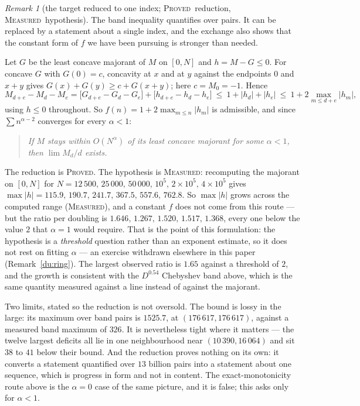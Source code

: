 \documentclass[11pt]{article}
\theoremstyle{definition}
\theoremstyle{remark}
\newtheorem{remark}[theorem]{Remark}
\newcommand{\PROVED}{\textsc{Proved}}
\newcommand{\MEASURED}{\textsc{Measured}}
\begin{document}
\begin{remark}[the target reduced to one index; \PROVED\ reduction, \MEASURED\ hypothesis]\label{fr:concave}
The band inequality quantifies over pairs. It can be replaced by a statement about a single index, and
the exchange also shows that the constant form of $f$ we have been pursuing is stronger than needed.

Let $G$ be the least concave majorant of $M$ on $[0,N]$ and $h=M-G\le0$. For concave $G$ with $G(0)=c$,
concavity at $x$ and at $y$ against the endpoints $0$ and $x+y$ gives $G(x)+G(y)\ge c+G(x+y)$; here
$c=M_0=-1$. Hence
\[
M_{d+e}-M_d-M_e=\bigl[G_{d+e}-G_d-G_e\bigr]+\bigl[h_{d+e}-h_d-h_e\bigr]
\ \le\ 1+|h_d|+|h_e|\ \le\ 1+2\max_{m\le d+e}|h_m| ,
\]
using $h\le0$ throughout. So $f(n)=1+2\max_{m\le n}|h_m|$ is admissible, and since $\sum n^{\alpha-2}$
converges for every $\alpha<1$:
\begin{quote}
\emph{If $M$ stays within $O(N^{\alpha})$ of its least concave majorant for some $\alpha<1$, then
$\lim M_d/d$ exists.}
\end{quote}
The reduction is \PROVED. The hypothesis is \MEASURED: recomputing the majorant on $[0,N]$ for
$N=12\,500,\,25\,000,\,50\,000,\,10^{5},\,2\times10^{5},\,4\times10^{5}$ gives
$\max|h|=115.9,\,190.7,\,241.7,\,367.5,\,557.6,\,762.8$. So $\max|h|$ grows across the computed range (\MEASURED), and a
constant $f$ does not come from this route --- but the ratio per doubling is
$1.646,\,1.267,\,1.520,\,1.517,\,1.368$, every one below the value $2$ that $\alpha=1$ would require.
That is the point of this formulation: the hypothesis is a \emph{threshold} question rather than an
exponent estimate, so it does not rest on fitting $\alpha$ --- an exercise withdrawn elsewhere in this
paper (Remark~\ref{du:ring}). The largest observed ratio is $1.65$ against a threshold of $2$, and the
growth is consistent with the $D^{0.54}$ Chebyshev band above, which is the same quantity measured
against a line instead of against the majorant.

Two limits, stated so the reduction is not oversold. The bound is lossy in the large: its maximum over
band pairs is $1525.7$, at $(176\,617,176\,617)$, against a measured band maximum of $326$. It is
nevertheless tight where it matters --- the twelve largest deficits all lie in one neighbourhood near
$(10\,390,16\,064)$ and sit $38$ to $41$ below their bound. And the reduction proves nothing on its own:
it converts a statement quantified over $13$ billion pairs into a statement about one sequence, which is
progress in form and not in content. The exact-monotonicity route above is the $\alpha=0$ case of the
same picture, and it is false; this asks only for $\alpha<1$.


\end{remark}
\end{document}
